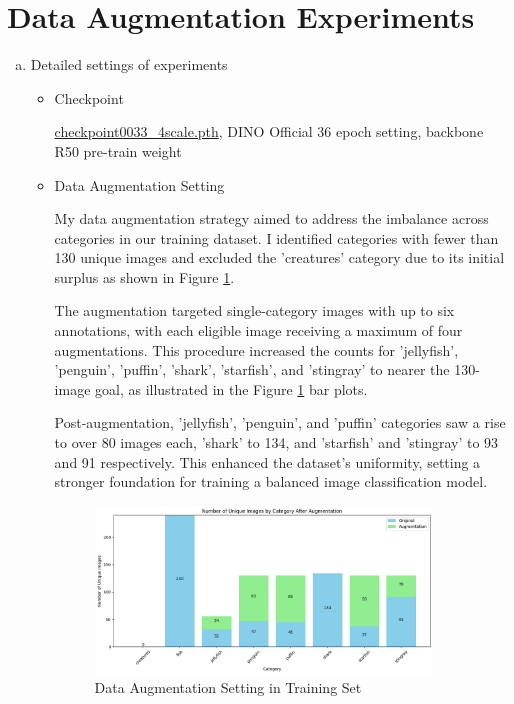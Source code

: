 \documentclass[10pt,a4paper]{article}
\begin{document}
\section*{Data Augmentation Experiments}
\begin{enumerate}[(a)]
\item Detailed settings of experiments
\begin{itemize}
\item Checkpoint

\href{https://drive.google.com/drive/folders/1qD5m1NmK0kjE5hh-G17XUX751WsEG-h_}{checkpoint0033\_4scale.pth}, DINO Official 36 epoch setting, backbone R50 pre-train weight

\item Data Augmentation Setting

My data augmentation strategy aimed to address the imbalance across categories in our training dataset. I identified categories with fewer than 130 unique images and excluded the 'creatures' category due to its initial surplus as shown in Figure \ref{fig:TrainingSetBarPlot}.

The augmentation targeted single-category images with up to six annotations, with each eligible image receiving a maximum of four augmentations. This procedure increased the counts for 'jellyfish', 'penguin', 'puffin', 'shark', 'starfish', and 'stingray' to nearer the 130-image goal, as illustrated in the Figure \ref{fig:TrainingSetBarPlot} bar plots.

Post-augmentation, 'jellyfish', 'penguin', and 'puffin' categories saw a rise to over 80 images each, 'shark' to 134, and 'starfish' and 'stingray' to 93 and 91 respectively. This enhanced the dataset's uniformity, setting a stronger foundation for training a balanced image classification model.


\begin{figure}[H]
\centering
\includegraphics[width=0.9\textwidth]{figure/data_augmentation_barplot.png}
\caption{Data Augmentation Setting in Training Set}
\label{fig:TrainingSetBarPlot}
\end{figure}


\end{itemize}
\end{enumerate}
\end{document}
